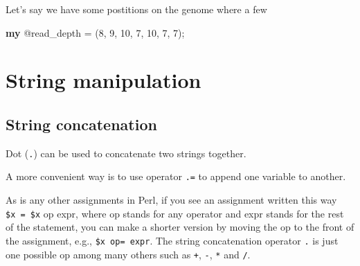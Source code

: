 \documentclass[]{book}
\makeatletter
\newenvironment{Shaded}{\begin{snugshade}}{\end{snugshade}}
\newcommand{\CommentTok}[1]{\textcolor[rgb]{0.56,0.35,0.01}{\textit{#1}}}
\newcommand{\DataTypeTok}[1]{\textcolor[rgb]{0.13,0.29,0.53}{#1}}
\newcommand{\DecValTok}[1]{\textcolor[rgb]{0.00,0.00,0.81}{#1}}
\newcommand{\KeywordTok}[1]{\textcolor[rgb]{0.13,0.29,0.53}{\textbf{#1}}}
\newcommand{\NormalTok}[1]{#1}
\newenvironment{kframe}{%
\medskip{}
\setlength{\fboxsep}{.8em}
 \def\at@end@of@kframe{}%
 \ifinner\ifhmode%
  \def\at@end@of@kframe{\end{minipage}}%
  \begin{minipage}{\columnwidth}%
 \fi\fi%
 \def\FrameCommand##1{\hskip\@totalleftmargin \hskip-\fboxsep
 \colorbox{shadecolor}{##1}\hskip-\fboxsep
     \hskip-\linewidth \hskip-\@totalleftmargin \hskip\columnwidth}%
 \MakeFramed {\advance\hsize-\width
   \@totalleftmargin\z@ \linewidth\hsize
   \@setminipage}}%
 {\par\unskip\endMakeFramed%
 \at@end@of@kframe}
\renewenvironment{Shaded}{\begin{kframe}}{\end{kframe}}
\makeatother
\begin{document}
Let's say we have some postitions on the genome where a few

\begin{Shaded}
\begin{Highlighting}[]
\KeywordTok{my} \DataTypeTok{@read_depth}\NormalTok{ = (}\DecValTok{8}\NormalTok{, }\DecValTok{9}\NormalTok{, }\DecValTok{10}\NormalTok{, }\DecValTok{7}\NormalTok{, }\DecValTok{10}\NormalTok{, }\DecValTok{7}\NormalTok{, }\DecValTok{7}\NormalTok{);}
\end{Highlighting}
\end{Shaded}

\hypertarget{string-manipulation}{%
\chapter{String manipulation}\label{string-manipulation}}

\hypertarget{string-concatenation}{%
\section{String concatenation}\label{string-concatenation}}

Dot (\texttt{.}) can be used to concatenate two strings together.

\begin{Shaded}
\end{Shaded}

A more convenient way is to use operator \texttt{.=} to append one variable to another.

As is any other assignments in Perl, if you see an assignment written this way \texttt{\$x\ =\ \$x} op expr, where op stands for any operator and expr stands for the rest of the statement, you can make a shorter version by moving the op to the front of the assignment, e.g., \texttt{\$x\ op=\ expr}. The string concatenation operator \texttt{.} is just one possible op among many others such as \texttt{+}, \texttt{-}, \texttt{*} and \texttt{/}.

\begin{Shaded}
\end{Shaded}
\end{document}
